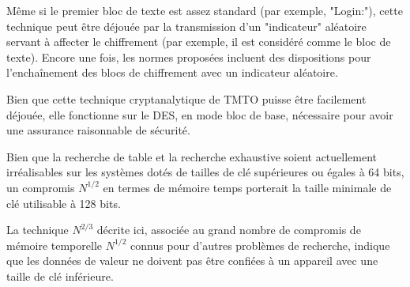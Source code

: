 		Même si le premier bloc de texte est assez standard (par exemple, "Login:"), cette technique peut être déjouée par la transmission d'un "indicateur" aléatoire servant à affecter le chiffrement (par exemple, il est considéré comme le bloc de texte). Encore une fois, les normes proposées\cite{ehellman} incluent des dispositions pour l'enchaînement des blocs de chiffrement avec un indicateur aléatoire.

		\bigskip

		Bien que cette technique cryptanalytique de \gls{TMTO} puisse être facilement déjouée, elle fonctionne sur le DES, en mode bloc de base, nécessaire pour avoir une assurance raisonnable de sécurité.

		\bigskip

		Bien que la recherche de table et la recherche exhaustive soient actuellement irréalisables sur les systèmes dotés de tailles de clé supérieures ou égales à 64 bits, un compromis $N^{1/2}$ en termes de mémoire temps porterait la taille minimale de clé utilisable à 128 bits.

		\bigskip

		La technique $N^{2/3}$ décrite ici, associée au grand nombre de compromis de mémoire temporelle $N^{1/2}$ connus pour d’autres problèmes de recherche, indique que les données de valeur ne doivent pas être confiées à un appareil avec une taille de clé inférieure.

\endinput{}
